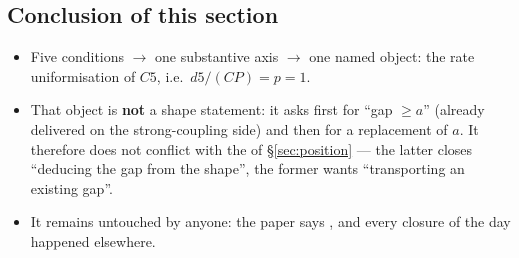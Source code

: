 \subsection{Conclusion of this section}

\begin{itemize}
\item Five conditions $\to$ one substantive axis $\to$ one named object: the rate uniformisation of
      $C5$, i.e.\ $d5/(CP)=p=1$. \LM
\item That object is \textbf{not} a shape statement: it asks first for ``gap $\ge a$'' (already
      delivered on the strong-coupling side) and then for a replacement of $a$. It therefore does not
      conflict with the \LN{} of \S\ref{sec:position} --- the latter closes ``deducing the gap from the
      shape'', the former wants ``transporting an existing gap''. \LT
\item It remains untouched by anyone: the paper says  \code{[M]}, and every closure
      of the day happened elsewhere. \LM
\end{itemize}


